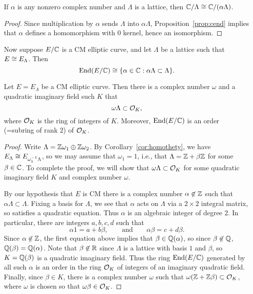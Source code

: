 \begin{corollary}\label{cor:homothety}
If $\alpha$ is any nonzero complex number and $\Lambda$ 
is a lattice, then
$\mathbb{C}/\Lambda\cong \mathbb{C}/(\alpha\Lambda)$.
\end{corollary}
\begin{proof}
Since multiplication by $\alpha$ sends $\Lambda$ into
$\alpha\Lambda$, Proposition~\ref{prop:cend} implies
that $\alpha$ defines a homomorphism with $0$ kernel,
hence an isomorphism. 
\end{proof}

Now suppose $E/\mathbb{C}$ is a CM elliptic curve, and let
$\Lambda$ be a lattice such that $E\cong E_{\Lambda}$.
Then 
$$
  \operatorname{End}(E/\mathbb{C}) \cong \{\alpha \in \mathbb{C} : \alpha \Lambda \subset \Lambda\}.
$$
\begin{proposition}
Let $E=E_{\Lambda}$ be a CM elliptic curve.
Then there is a complex number $\omega$ and a quadratic
imaginary field such $K$ that 
$$\omega\Lambda\subset \mathcal{O}_K,$$
where $\mathcal{O}_K$ is the ring of integers of $K$.
Moreover, $\operatorname{End}(E/\mathbb{C})$ is an order (=subring of rank $2$) of $\mathcal{O}_K$.
\end{proposition}
\begin{proof}
Write $\Lambda = \mathbb{Z}\omega_1 \oplus \mathbb{Z}\omega_2$.
By Corollary~\ref{cor:homothety}, we have
$E_{\Lambda} \cong E_{\omega_1^{-1}\Lambda}$,
so we may assume that $\omega_1 = 1$, i.e., 
that $\Lambda = \mathbb{Z} + \beta \mathbb{Z}$ for some $\beta\in \mathbb{C}$.
To complete the proof, we will show that $\omega \Lambda\subset \mathcal{O}_K$
for some quadratic imaginary field $K$ and complex number $\omega$.

By our hypothesis that $E$ is CM
there is a complex number $\alpha \not\in\mathbb{Z}$
such that $\alpha\Lambda \subset \Lambda$. 
Fixing a basis for $\Lambda$, we see that 
$\alpha$ acts on $\Lambda$ via a $2\times 2$
integral matrix, so satisfies a quadratic equation.
Thus $\alpha$ is an algebraic integer of degree $2$.
In particular,
there are integers $a,b,c,d$ such that
$$ 
  \alpha 1 = a + b\beta,\qquad\text{and}\qquad
  \alpha \beta = c + d\beta.
$$
Since $\alpha\not\in\mathbb{Z}$, the first equation above 
implies that $\beta \in \mathbb{Q}(\alpha)$, so since
$\beta\not\in\mathbb{Q}$, $\mathbb{Q}(\beta)=\mathbb{Q}(\alpha)$.
Note that $\beta\not\in\mathbb{R}$ since $\Lambda$ is a lattice
with basis $1$ and $\beta$,
so $K=\mathbb{Q}(\beta)$ is a quadratic imaginary field.
Thus the ring $\operatorname{End}(E/\mathbb{C})$ generated by all such $\alpha$
is an order in the ring $\mathcal{O}_K$ of integers
of an imaginary quadratic field. 
Finally, since $\beta\in K$, there is a complex
number $\omega$ such that $\omega (\mathbb{Z} + \mathbb{Z}\beta) \subset \mathcal{O}_K$,
where $\omega$ is chosen so that $\omega\beta\in\mathcal{O}_K$.
\end{proof}


